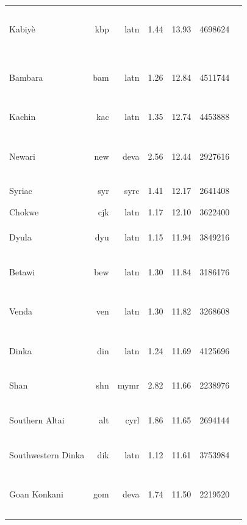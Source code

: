 \documentclass[11pt]{article}
\begin{document}
\begin{center}
\begin{longtable}[width=0.9\textwidth]{|lrrrrrl|}
Kabiyè & kbp & latn & 1.44 & 13.93 & 4698624 & {\color{nllb}\rule{1.36cm}{8pt}}{\color{madlad400}\rule{1.94cm}{8pt}}{\color{glot500}\rule{0.35cm}{8pt}}{\color{other}\rule{0.3500000000000001cm}{8pt}} \\ 
Bambara & bam & latn & 1.26 & 12.84 & 4511744 & {\color{nllb}\rule{2.72cm}{8pt}}{\color{madlad400}\rule{0.61cm}{8pt}}{\color{glot500}\rule{0.41cm}{8pt}}{\color{other}\rule{0.2599999999999998cm}{8pt}} \\ 
Kachin & kac & latn & 1.35 & 12.74 & 4453888 & {\color{nllb}\rule{1.7cm}{8pt}}{\color{madlad400}\rule{2.3cm}{8pt}}{\color{glot500}\rule{0.0cm}{8pt}} \\ 
Newari & new & deva & 2.56 & 12.44 & 2927616 & {\color{oscar}\rule{0.15cm}{8pt}}{\color{madlad400}\rule{0.82cm}{8pt}}{\color{glot500}\rule{1.91cm}{8pt}}{\color{other}\rule{1.12cm}{8pt}} \\ 
Syriac & syr & syrc & 1.41 & 12.17 & 2641408 & {\color{madlad400}\rule{4.0cm}{8pt}} \\ 
Chokwe & cjk & latn & 1.17 & 12.10 & 3622400 & {\color{nllb}\rule{4.0cm}{8pt}}{\color{glot500}\rule{0.0cm}{8pt}} \\ 
Dyula & dyu & latn & 1.15 & 11.94 & 3849216 & {\color{nllb}\rule{2.74cm}{8pt}}{\color{glot500}\rule{0.0cm}{8pt}}{\color{other}\rule{1.2599999999999998cm}{8pt}} \\ 
Betawi & bew & latn & 1.30 & 11.84 & 3186176 & {\color{madlad400}\rule{1.87cm}{8pt}}{\color{glot500}\rule{0.07cm}{8pt}}{\color{other}\rule{2.0599999999999996cm}{8pt}} \\ 
Venda & ven & latn & 1.30 & 11.82 & 3268608 & {\color{madlad400}\rule{2.21cm}{8pt}}{\color{glot500}\rule{1.39cm}{8pt}}{\color{other}\rule{0.40000000000000036cm}{8pt}} \\ 
Dinka & din & latn & 1.24 & 11.69 & 4125696 & {\color{nllb}\rule{2.94cm}{8pt}}{\color{madlad400}\rule{0.71cm}{8pt}}{\color{other}\rule{0.3500000000000001cm}{8pt}} \\ 
Shan & shn & mymr & 2.82 & 11.66 & 2238976 & {\color{nllb}\rule{2.69cm}{8pt}}{\color{madlad400}\rule{1.31cm}{8pt}} \\ 
Southern Altai & alt & cyrl & 1.86 & 11.65 & 2694144 & {\color{madlad400}\rule{2.33cm}{8pt}}{\color{glot500}\rule{0.28cm}{8pt}}{\color{other}\rule{1.3899999999999997cm}{8pt}} \\ 
Southwestern Dinka & dik & latn & 1.12 & 11.61 & 3753984 & {\color{nllb}\rule{3.7cm}{8pt}}{\color{other}\rule{0.2999999999999998cm}{8pt}} \\ 
Goan Konkani & gom & deva & 1.74 & 11.50 & 2219520 & {\color{oscar}\rule{0.14cm}{8pt}}{\color{madlad400}\rule{1.3cm}{8pt}}{\color{glot500}\rule{1.36cm}{8pt}}{\color{other}\rule{1.2000000000000002cm}{8pt}} \\ 

\end{longtable}
\end{center}
\end{document}
